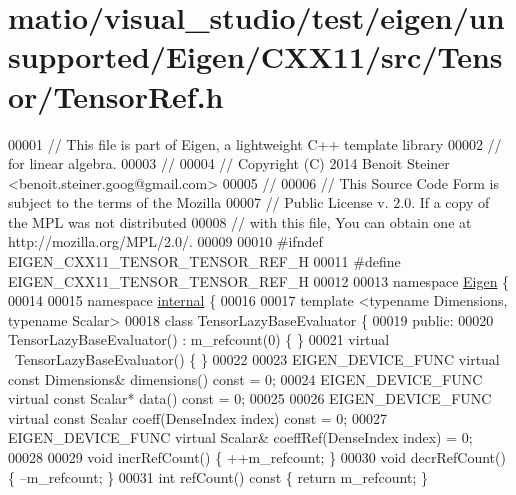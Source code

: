 \hypertarget{matio_2visual__studio_2test_2eigen_2unsupported_2_eigen_2_c_x_x11_2src_2_tensor_2_tensor_ref_8h_source}{}\section{matio/visual\+\_\+studio/test/eigen/unsupported/\+Eigen/\+C\+X\+X11/src/\+Tensor/\+Tensor\+Ref.h}
\label{matio_2visual__studio_2test_2eigen_2unsupported_2_eigen_2_c_x_x11_2src_2_tensor_2_tensor_ref_8h_source}

\begin{DoxyCode}
00001 \textcolor{comment}{// This file is part of Eigen, a lightweight C++ template library}
00002 \textcolor{comment}{// for linear algebra.}
00003 \textcolor{comment}{//}
00004 \textcolor{comment}{// Copyright (C) 2014 Benoit Steiner <benoit.steiner.goog@gmail.com>}
00005 \textcolor{comment}{//}
00006 \textcolor{comment}{// This Source Code Form is subject to the terms of the Mozilla}
00007 \textcolor{comment}{// Public License v. 2.0. If a copy of the MPL was not distributed}
00008 \textcolor{comment}{// with this file, You can obtain one at http://mozilla.org/MPL/2.0/.}
00009 
00010 \textcolor{preprocessor}{#ifndef EIGEN\_CXX11\_TENSOR\_TENSOR\_REF\_H}
00011 \textcolor{preprocessor}{#define EIGEN\_CXX11\_TENSOR\_TENSOR\_REF\_H}
00012 
00013 \textcolor{keyword}{namespace }\hyperlink{namespace_eigen}{Eigen} \{
00014 
00015 \textcolor{keyword}{namespace }\hyperlink{namespaceinternal}{internal} \{
00016 
00017 \textcolor{keyword}{template} <\textcolor{keyword}{typename} Dimensions, \textcolor{keyword}{typename} Scalar>
00018 \textcolor{keyword}{class }TensorLazyBaseEvaluator \{
00019  \textcolor{keyword}{public}:
00020   TensorLazyBaseEvaluator() : m\_refcount(0) \{ \}
00021   \textcolor{keyword}{virtual} ~TensorLazyBaseEvaluator() \{ \}
00022 
00023   EIGEN\_DEVICE\_FUNC \textcolor{keyword}{virtual} \textcolor{keyword}{const} Dimensions& dimensions() \textcolor{keyword}{const} = 0;
00024   EIGEN\_DEVICE\_FUNC \textcolor{keyword}{virtual} \textcolor{keyword}{const} Scalar* data() \textcolor{keyword}{const} = 0;
00025 
00026   EIGEN\_DEVICE\_FUNC \textcolor{keyword}{virtual} \textcolor{keyword}{const} Scalar coeff(DenseIndex index) \textcolor{keyword}{const} = 0;
00027   EIGEN\_DEVICE\_FUNC \textcolor{keyword}{virtual} Scalar& coeffRef(DenseIndex index) = 0;
00028 
00029   \textcolor{keywordtype}{void} incrRefCount() \{ ++m\_refcount; \}
00030   \textcolor{keywordtype}{void} decrRefCount() \{ --m\_refcount; \}
00031   \textcolor{keywordtype}{int} refCount()\textcolor{keyword}{ const }\{ \textcolor{keywordflow}{return} m\_refcount; \}

\end{DoxyCode}
